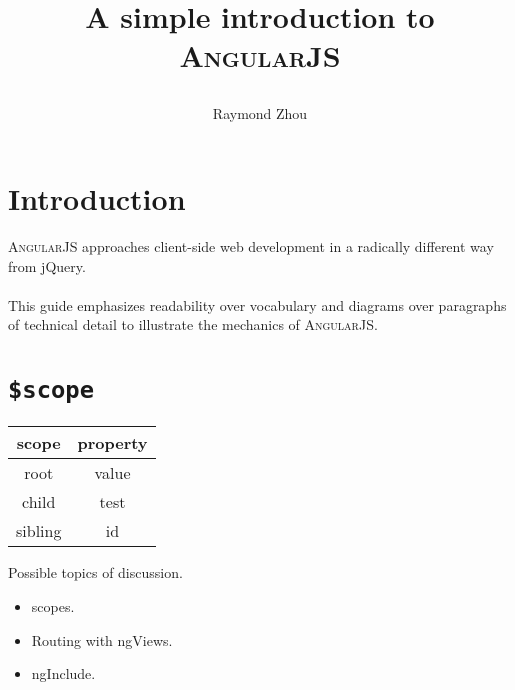 \documentclass[12pt]{article}
\title{A simple introduction to \textsc{AngularJS}\date{}}
\author{Raymond Zhou}
\begin{document}
\fancyhf{}
\fancyfoot[C]{\thepage}
\renewcommand{\footrulewidth}{0.4pt}  %

\maketitle{}

\section{Introduction}

\textsc{AngularJS} approaches client-side web development in a radically different way from jQuery.
\\\\
This guide emphasizes readability over vocabulary and diagrams over paragraphs of technical detail to illustrate the mechanics of \textsc{AngularJS}.

\section{\texttt{\$scope}}

\begin{center}
  \begin{tabular}{cc}
    \toprule
      \textbf{scope} & \textbf{property}\tabularnewline
    \midrule
      root           & value \tabularnewline
      child          & test  \tabularnewline
      sibling        & id    \tabularnewline
    \bottomrule
  \end{tabular}
\end{center}

\begin{center}
  \begin{tikzpicture}

  \end{tikzpicture}
\end{center}

Possible topics of discussion.

\begin{itemize}
  \item scopes.
  \item Routing with ngViews.
  \item ngInclude.

\end{itemize}
\end{document}
